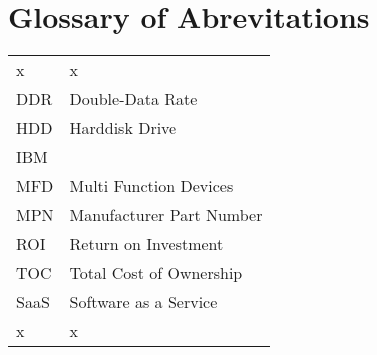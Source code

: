 

\chapter*{Glossary of Abrevitations}



\begin{center}
	\begin{tabular}{ll}
	    x       &   x                                   \\
	    DDR     &   Double-Data Rate                    \\
	    HDD     &   Harddisk Drive                      \\
	    IBM     &                                       \\%
		MFD     &   Multi Function Devices              \\
    	MPN     &   Manufacturer Part Number            \\
		ROI     &   Return on Investment                \\
		TOC     &   Total Cost of Ownership             \\
		SaaS    &   Software as a Service               \\
		x       &   x                                   \\
	\end{tabular}
	\label{tab:glossary_of_abbreviations}
\end{center}

